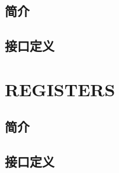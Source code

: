 \documentclass{article}
\begin{document}
\subsection{简介}

\FloatBarrier
\subsection{接口定义}

\FloatBarrier

\section{REGISTERS\label{sec:REGISTERS}}

\subsection{简介}

\FloatBarrier
\subsection{接口定义}
\end{document}
